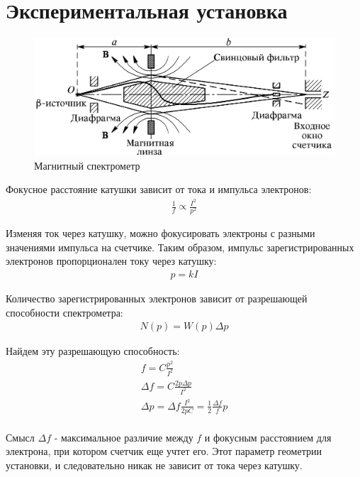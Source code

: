 \documentclass[12pt]{article}
\begin{document}
\section{Экспериментальная установка}

\begin{figure}[H]
    \caption{Магнитный спектрометр}
    \centering
    \includegraphics[width=\linewidth]{dev.png}
\end{figure}

Фокусное расстояние катушки зависит от тока и импульса электронов:
\begin{gather*}
    \frac{1}{f} \propto \frac{I^2}{p^2}
\end{gather*}

Изменяя ток через катушку, можно фокусировать электроны с разными значениями
импульса на счетчике.
Таким образом, импульс зарегистрированных электронов пропорционален току через катушку:
\begin{gather*}
    p = kI
\end{gather*}

Количество зарегистрированных электронов зависит от разрешающей способности спектрометра:
\begin{gather*}
    N(p) = W(p) \Delta p
\end{gather*}

Найдем эту разрешающую способность:
\begin{gather*}
    f = C \frac{p^2}{I^2} \\ 
    \Delta f = C \frac{2 p \Delta p}{I^2} \\ 
    \Delta p =
        \Delta f \frac{I^2} {2 p C} =
        \frac{1}{2} \frac{\Delta f}{f} p \\
\end{gather*}

Смысл $\Delta f$ - максимальное различие между $f$
и фокусным расстоянием для электрона, при котором счетчик еще учтет его.
Этот параметр геометрии установки, и следовательно никак не зависит от тока через катушку.
\end{document}

